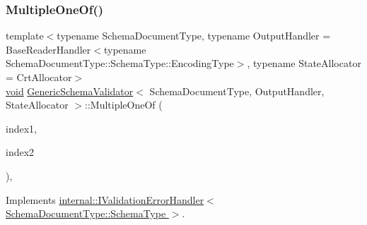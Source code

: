\mbox{\label{classGenericSchemaValidator_a53c37b0dba5f2ca79d2c7c13488e5ffd}} 
\subsubsection{\texorpdfstring{Multiple\+One\+Of()}{MultipleOneOf()}}
{\footnotesize\ttfamily template$<$typename Schema\+Document\+Type, typename Output\+Handler = Base\+Reader\+Handler$<$typename Schema\+Document\+Type\+::\+Schema\+Type\+::\+Encoding\+Type$>$, typename State\+Allocator = Crt\+Allocator$>$ \\
\hyperlink{imgui__impl__opengl3__loader_8h_ac668e7cffd9e2e9cfee428b9b2f34fa7}{void} \hyperlink{classGenericSchemaValidator}{Generic\+Schema\+Validator}$<$ Schema\+Document\+Type, Output\+Handler, State\+Allocator $>$\+::Multiple\+One\+Of (\begin{DoxyParamCaption}\item[{\hyperlink{rapidjson_8h_a5ed6e6e67250fadbd041127e6386dcb5}{Size\+Type}}]{index1,  }\item[{\hyperlink{rapidjson_8h_a5ed6e6e67250fadbd041127e6386dcb5}{Size\+Type}}]{index2 }\end{DoxyParamCaption})\hspace{0.3cm}{\ttfamily [inline]}, {\ttfamily [virtual]}}



Implements \hyperlink{classinternal_1_1IValidationErrorHandler_aea207ebba88ff7d198b55b04f0ff43e0}{internal\+::\+I\+Validation\+Error\+Handler$<$ Schema\+Document\+Type\+::\+Schema\+Type $>$}.

\mbox{\label{classGenericSchemaValidator_aae9c45082721c650b91f8418cecc7293}} 
